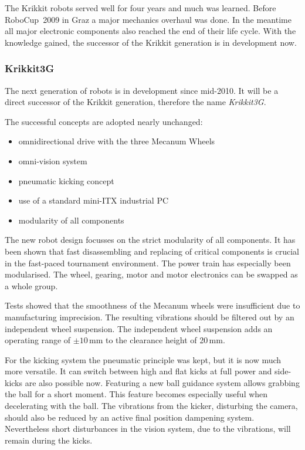 \documentclass[12pt,a4paper]{article}
\begin{document}
The Krikkit robots served well for four years and much was learned.
Before RoboCup~2009 in Graz a major mechanics overhaul was done.
In the meantime all major electronic components also reached the end of their life cycle.
With the knowledge gained, the successor of the Krikkit generation is in development now.
    

\subsubsection{Krikkit3G}

The next generation of robots is in development since mid-2010.
It will be a direct successor of the Krikkit generation, therefore the name \emph{Krikkit3G}.

The successful concepts are adopted nearly unchanged:\nopagebreak[4] %
\begin{itemize}
  \item omnidirectional drive with the three Mecanum Wheels
  \item omni-vision system
  \item pneumatic kicking concept
  \item use of a standard mini-ITX industrial PC
  \item modularity of all components
\end{itemize}

The new robot design focusses on the strict modularity of all components.
It has been shown that fast disassembling and replacing of critical components is crucial in the fast-paced tournament environment.
The power train has especially been modularised.
The wheel, gearing, motor and motor electronics can be swapped as a whole group.

Tests showed that the smoothness of the Mecanum wheels were insufficient due to manufacturing imprecision.
The resulting vibrations should be filtered out by an independent wheel suspension.
The independent wheel suspension adds an  operating range of $\pm 10$\,mm to the clearance height of 20\,mm.


For the kicking system the pneumatic principle was kept, but it is now much more versatile. 
It can switch between high and flat kicks at full power and side-kicks are also possible now.
Featuring a new ball guidance system allows grabbing the ball for a short moment.
This feature becomes especially useful when decelerating with the ball.
The vibrations from the kicker, disturbing the camera, should also be reduced by an active final position dampening system.
Nevertheless short disturbances in the vision system, due to the vibrations, will remain during the kicks.
\end{document}
